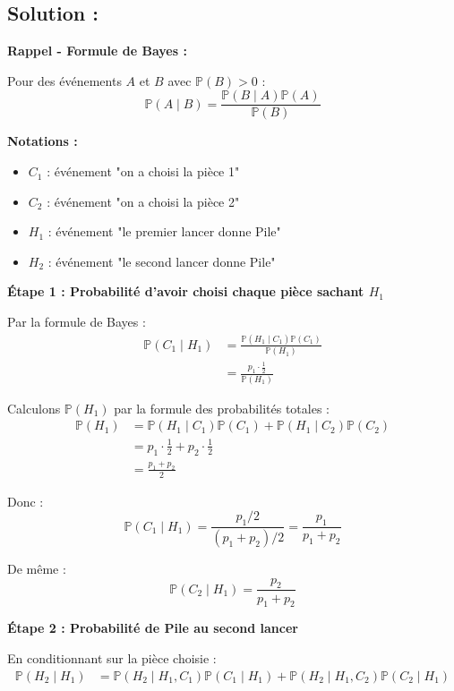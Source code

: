 \subsection*{Solution :}

\textbf{Rappel - Formule de Bayes :}

Pour des événements $A$ et $B$ avec $\mathbb{P}(B) > 0$ :
\[
\mathbb{P}(A \mid B) = \frac{\mathbb{P}(B \mid A) \mathbb{P}(A)}{\mathbb{P}(B)}
\]

\textbf{Notations :}

\begin{itemize}
    \item $C_1$ : événement "on a choisi la pièce 1"
    \item $C_2$ : événement "on a choisi la pièce 2"
    \item $H_1$ : événement "le premier lancer donne Pile"
    \item $H_2$ : événement "le second lancer donne Pile"
\end{itemize}

\textbf{Étape 1 : Probabilité d'avoir choisi chaque pièce sachant $H_1$}

Par la formule de Bayes :
\begin{align*}
\mathbb{P}(C_1 \mid H_1) &= \frac{\mathbb{P}(H_1 \mid C_1) \mathbb{P}(C_1)}{\mathbb{P}(H_1)} \\
&= \frac{p_1 \cdot \frac{1}{2}}{\mathbb{P}(H_1)}
\end{align*}

Calculons $\mathbb{P}(H_1)$ par la formule des probabilités totales :
\begin{align*}
\mathbb{P}(H_1) &= \mathbb{P}(H_1 \mid C_1) \mathbb{P}(C_1) + \mathbb{P}(H_1 \mid C_2) \mathbb{P}(C_2) \\
&= p_1 \cdot \frac{1}{2} + p_2 \cdot \frac{1}{2} \\
&= \frac{p_1 + p_2}{2}
\end{align*}

Donc :
\[
\mathbb{P}(C_1 \mid H_1) = \frac{p_1/2}{(p_1 + p_2)/2} = \frac{p_1}{p_1 + p_2}
\]

De même :
\[
\mathbb{P}(C_2 \mid H_1) = \frac{p_2}{p_1 + p_2}
\]

\textbf{Étape 2 : Probabilité de Pile au second lancer}

En conditionnant sur la pièce choisie :
\begin{align*}
\mathbb{P}(H_2 \mid H_1) &= \mathbb{P}(H_2 \mid H_1, C_1) \mathbb{P}(C_1 \mid H_1) + \mathbb{P}(H_2 \mid H_1, C_2) \mathbb{P}(C_2 \mid H_1)
\end{align*}

